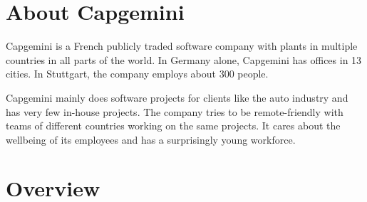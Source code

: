 

\section{About Capgemini}
\label{sec:intro-about-capgemini}

Capgemini is a French publicly traded software company with plants in multiple countries in all parts of the world. In Germany alone, Capgemini has offices in 13 cities. In Stuttgart, the company employs about 300 people.

Capgemini mainly does software projects for clients like the auto industry and has very few in-house projects. The company tries to be remote-friendly with teams of different countries working on the same projects. It cares about the wellbeing of its employees and has a surprisingly young workforce.


\section{Overview}
\label{sec:intro:overview}

